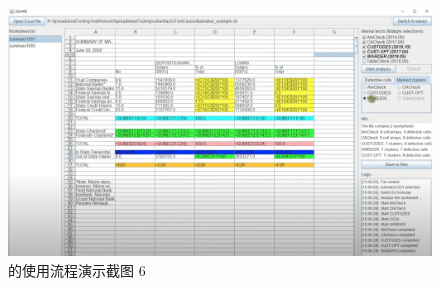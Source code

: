 \begin{figure}[tbp]    
    \centering
    \includegraphics[width=\textwidth]{figure/sg/sguard-6.png}
    \caption{\sg 的使用流程演示截图 6}
    \label{figure-sg6}
\end{figure}